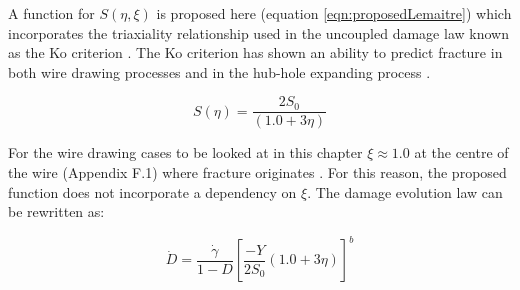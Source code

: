 \documentclass[sn-mathphys,Numbered,draft]{sn-jnl}%
\begin{document}
A function for $S(\eta,\xi)$ is proposed here (equation \ref{eqn:proposedLemaitre}) which incorporates the triaxiality relationship used in the uncoupled damage law known as the Ko criterion \cite{ko_prediction_2007}. The Ko criterion has shown an ability to predict fracture in both wire drawing processes \cite{roh_process_2021} and in the hub-hole expanding process \cite{ko_prediction_2007}.

\begin{equation}
\label{eqn:proposedLemaitre}
S(\eta)=\frac{2S_0}{\left(1.0+3\eta\right)}
\end{equation}

For the wire drawing cases to be looked at in this chapter $\xi\approx1.0$ at the centre of the wire (Appendix F.1) where fracture originates \cite{roh_process_2021}. For this reason, the proposed function does not incorporate a dependency on $\xi$. The damage evolution law can be rewritten as:




\begin{equation}
\dot{D}=\frac{\dot{\gamma}}{1-D}\left[\frac{-Y}{2S_0}\left(1.0+3\eta\right)\right]^b
 \end{equation}



\end{document}
